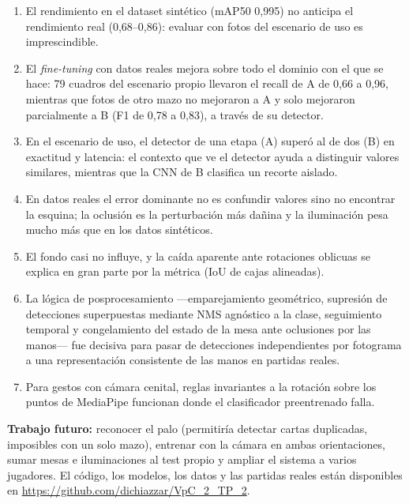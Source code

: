 \documentclass[conference,a4paper]{IEEEtran}
\begin{document}
\begin{enumerate}
\item El rendimiento en el dataset sintético (mAP50 0,995) no anticipa el rendimiento real (0,68--0,86): evaluar con
fotos del escenario de uso es imprescindible.
\item El \textit{fine-tuning} con datos reales mejora sobre todo el dominio con el que se hace: 79 cuadros del escenario
propio llevaron el recall de A de 0,66 a 0,96, mientras que fotos de otro mazo no mejoraron a A y solo mejoraron
parcialmente a B (F1 de 0,78 a 0,83), a través de su detector.
\item En el escenario de uso, el detector de una etapa (A) superó al de dos (B) en exactitud y latencia: el contexto que ve el detector
ayuda a distinguir valores similares, mientras que la CNN de B clasifica un recorte aislado.
\item En datos reales el error dominante no es confundir valores sino no encontrar la esquina; la oclusión es la
perturbación más dañina y la iluminación pesa mucho más que en los datos sintéticos.
\item El fondo casi no influye, y la caída aparente ante rotaciones oblicuas se explica en gran parte por la métrica
(IoU de cajas alineadas).
\item La lógica de posprocesamiento —emparejamiento geométrico, supresión de detecciones superpuestas mediante NMS agnóstico a la clase, seguimiento temporal y congelamiento del estado de la mesa ante oclusiones por las manos— fue decisiva para pasar de detecciones independientes por fotograma a una representación consistente de las manos en partidas reales.
\item Para gestos con cámara cenital, reglas invariantes a la rotación sobre los puntos de MediaPipe funcionan donde el
clasificador preentrenado falla.
\end{enumerate}
\textbf{Trabajo futuro:} reconocer el palo (permitiría detectar cartas duplicadas, imposibles con un solo mazo),
entrenar con la cámara en ambas orientaciones, sumar mesas e iluminaciones al test propio y ampliar el sistema a
varios jugadores. El código, los modelos, los datos y las partidas reales están disponibles en
\url{https://github.com/dichiazzar/VpC_2_TP_2}.




\end{document}
